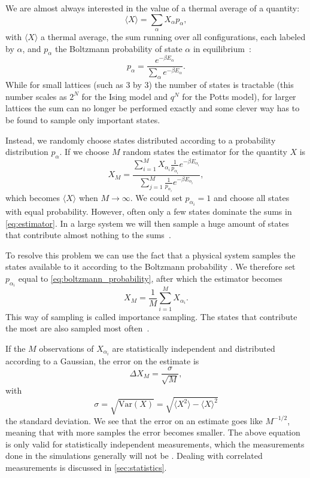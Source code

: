 \documentclass[11pt, a4paper]{report} %
\begin{document}
We are almost always interested in the value of a thermal average of a quantity:
\begin{equation}
	\langle X \rangle = \sum_{\alpha}X_{\alpha}p_{\alpha},
\end{equation}
with \(\langle X \rangle\) a thermal average, the sum running over all configurations, each labeled by \(\alpha\), and \(p_{\alpha}\) the Boltzmann probability of state \(\alpha\) in equilibrium~\cite{binney:1992}:
\begin{equation}\label{eq:boltzmann_probability}
	p_{\alpha} = \frac{e^{-\beta E_{\alpha}}}{\sum_{\alpha}e^{-\beta E_{\alpha}}}.
\end{equation}
While for small lattices (such as 3 by 3) the number of states is tractable (this number scales as \(2^{N}\) for the Ising model and \(q^{N}\) for the Potts model), for larger lattices the sum can no longer be performed exactly and some clever way has to be found to sample only important states.

Instead, we randomly choose states distributed according to a probability distribution \(p_{\alpha}\).
If we choose \(M\) random states the estimator for the quantity \(X\) is
\begin{equation}\label{eq:estimator}
	X_M = \frac{\sum_{i=1}^M X_{\alpha_i}\frac{1}{p_{\alpha_i}}e^{-\beta E_{\alpha_i}}}{\sum_{j=1}^M \frac{1}{p_{\alpha_i}} e^{-\beta E_{\alpha_i}}},
\end{equation}
which becomes \(\langle X \rangle\) when \(M \to \infty\).
We could set \(p_{\alpha_i}=1\) and choose all states with equal probability.
However, often only a few states dominate the sums in \cref{eq:estimator}.
In a large system we will then sample a huge amount of states that contribute almost nothing to the sums~\cite{newman:1999}.

To resolve this problem we can use the fact that a physical system samples the states available to it according to the Boltzmann probability .
We therefore set \(p_{\alpha_i}\) equal to \cref{eq:boltzmann_probability}, after which the estimator becomes
\begin{equation}
	X_M = \frac{1}{M} \sum_{i=1}^M X_{\alpha_i}.
\end{equation}
This way of sampling is called importance sampling. The states that contribute the most are also sampled most often~\cite{newman:1999}.

If the \(M\) observations of \(X_{\alpha_i}\) are statistically independent and distributed according to a Gaussian, the error on the estimate is
\begin{equation}\label{eq:uncorrelated_error}
	\Delta X_M = \frac{\sigma}{\sqrt{M}},
\end{equation}
with
\begin{equation}
	\sigma = \sqrt{\mathrm{Var}(X)} = \sqrt{\langle X^2 \rangle - \langle X \rangle^2}
\end{equation}
the standard deviation.
We see that the error on an estimate goes like \(M^{-1/2}\), meaning that with more samples the error becomes smaller.
The above equation is only valid for statistically independent measurements, which the measurements done in the simulations generally will not be \cite{landau:2015}.
Dealing with correlated measurements is discussed in \cref{sec:statistics}.
\end{document}
